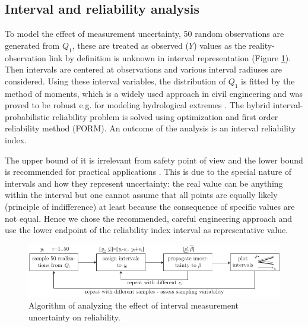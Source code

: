 \subsection{Interval and reliability analysis}
\label{subsec:interval_reli}
To model the effect of measurement uncertainty, 50 random observations are generated from $Q_1$, these are treated as observed ($Y$) values as the reality-observation link by definition is unknown in interval representation (Figure \ref{fig:int_alg}). Then intervals are centered at observations and various interval radiuses are considered. Using these interval variables, the distribution of $Q_1$ is fitted by the method of moments, which is a widely used approach in civil engineering \citep{Sanpaolesi1998} and was proved to be robust e.g. for modeling hydrological extremes \citep{Madsen1997}. The hybrid interval-probabilistic reliability problem is solved using optimization and first order reliability method (FORM). An outcome of the analysis is an interval reliability index.

The upper bound of it is irrelevant from safety point of view and the lower bound is recommended for practical applications \citep{Qiu2007}. This is due to the special nature of intervals and how they represent uncertainty: the real value can be anything within the interval but one cannot assume that all points are equally likely (principle of indifference) at least because the consequence of specific values are not equal. Hence we chose the recommended, careful engineering approach and use the lower endpoint of the reliability index interval as representative value.
\begin{figure}[htbp!] 
	\centering    
	\includegraphics[]{interval_analysis_algorithm_.pdf}
	\caption{Algorithm of analyzing the effect of interval measurement uncertainty on reliability.}
	\label{fig:int_alg}
\end{figure}

